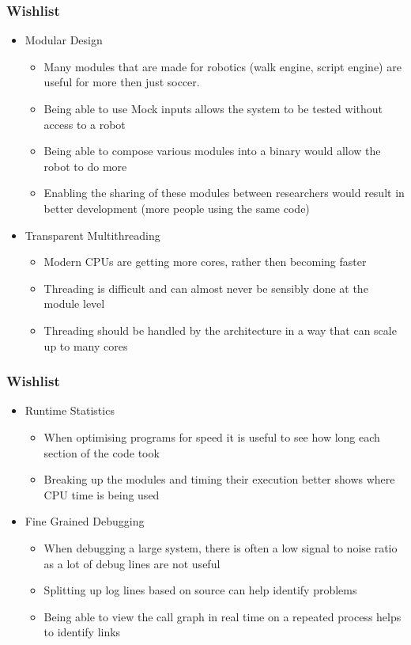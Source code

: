 \documentclass{beamer}
\begin{document}
\begin{frame}
	\frametitle{Wishlist}
	\begin{itemize}
		\item Modular Design
			\begin{itemize}
				\item Many modules that are made for robotics (walk engine, script engine) are useful for more then just soccer.
				\item Being able to use Mock inputs allows the system to be tested without access to a robot
				\item Being able to compose various modules into a binary would allow the robot to do more
				\item Enabling the sharing of these modules between researchers would result in better development (more people using the same code)
			\end{itemize}

		\item Transparent Multithreading
			\begin{itemize}
				\item Modern CPUs are getting more cores, rather then becoming faster
				\item Threading is difficult and can almost never be sensibly done at the module level
				\item Threading should be handled by the architecture in a way that can scale up to many cores
			\end{itemize}
	\end{itemize}
\end{frame}

\begin{frame}
	\frametitle{Wishlist}
	\begin{itemize}
		\item Runtime Statistics
			\begin{itemize}
				\item When optimising programs for speed it is useful to see how long each section of the code took
				\item Breaking up the modules and timing their execution better shows where CPU time is being used
			\end{itemize}

		\item Fine Grained Debugging
			\begin{itemize}
				\item When debugging a large system, there is often a low signal to noise ratio as a lot of debug lines are not useful
				\item Splitting up log lines based on source can help identify problems
				\item Being able to view the call graph in real time on a repeated process helps to identify links
			\end{itemize}
	\end{itemize}
\end{frame}
\end{document}
